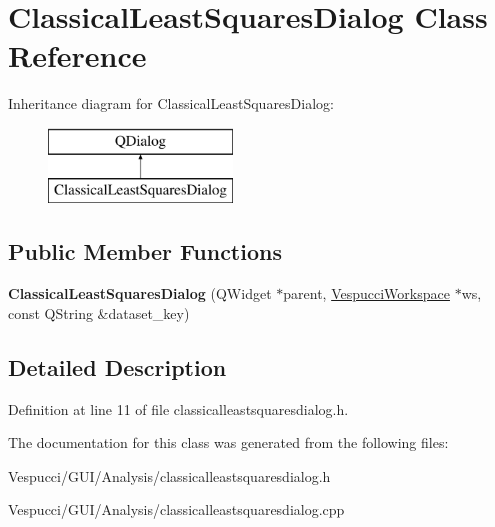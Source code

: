 \hypertarget{class_classical_least_squares_dialog}{}\section{Classical\+Least\+Squares\+Dialog Class Reference}
\label{class_classical_least_squares_dialog}
Inheritance diagram for Classical\+Least\+Squares\+Dialog\+:\begin{figure}[H]
\begin{center}
\leavevmode
\includegraphics[height=2.000000cm]{class_classical_least_squares_dialog}
\end{center}
\end{figure}
\subsection*{Public Member Functions}
\begin{DoxyCompactItemize}
\item 
{\bfseries Classical\+Least\+Squares\+Dialog} (Q\+Widget $\ast$parent, \hyperlink{class_vespucci_workspace}{Vespucci\+Workspace} $\ast$ws, const Q\+String \&dataset\+\_\+key)\hypertarget{class_classical_least_squares_dialog_a1bf3e79a493d7924e4c9eec9b00d8763}{}\label{class_classical_least_squares_dialog_a1bf3e79a493d7924e4c9eec9b00d8763}

\end{DoxyCompactItemize}


\subsection{Detailed Description}


Definition at line 11 of file classicalleastsquaresdialog.\+h.



The documentation for this class was generated from the following files\+:\begin{DoxyCompactItemize}
\item 
Vespucci/\+G\+U\+I/\+Analysis/classicalleastsquaresdialog.\+h\item 
Vespucci/\+G\+U\+I/\+Analysis/classicalleastsquaresdialog.\+cpp\end{DoxyCompactItemize}
